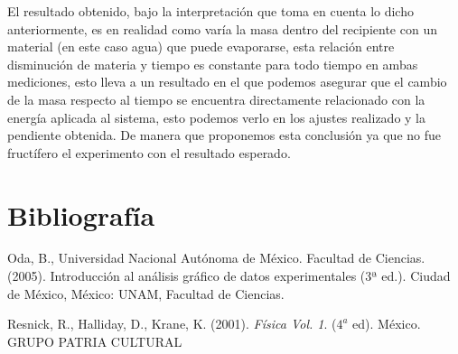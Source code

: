 \documentclass[a4paper]{article}
\begin{document}
El resultado obtenido, bajo la interpretación que toma en cuenta lo dicho anteriormente, es en realidad como varía la masa dentro del recipiente con un material (en este caso agua) que puede evaporarse, esta relación entre disminución de materia y tiempo es constante para todo tiempo en ambas mediciones, esto lleva a un resultado en el que podemos asegurar que el cambio de la masa respecto al tiempo se encuentra directamente relacionado con la energía aplicada al sistema, esto podemos verlo en los ajustes realizado y la pendiente obtenida. De manera que proponemos esta conclusión ya que no fue fructífero el experimento con el resultado esperado.
\section*{Bibliografía}
Oda, B.,  Universidad Nacional Autónoma de México. Facultad de Ciencias. (2005). Introducción al análisis gráfico de datos experimentales (3ª ed.). Ciudad de México, México: UNAM, Facultad de Ciencias.

Resnick, R., Halliday, D., Krane, K. (2001). \textit{Física Vol. 1}. ($4^a$ ed). México. GRUPO PATRIA CULTURAL
\end{document}
